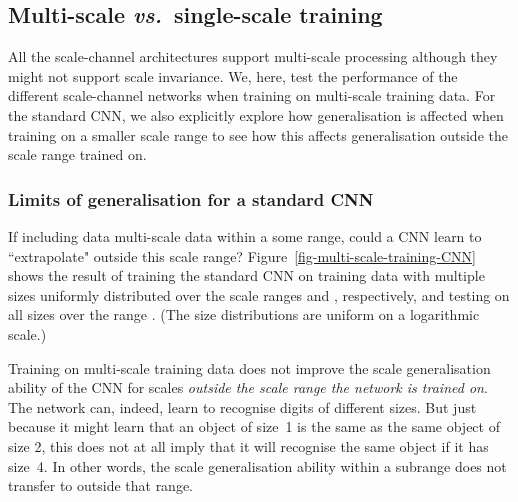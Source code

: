 \documentclass[twocolumn,runningheads]{svjour3}
\begin{document}
\subsection{Multi-scale {\em vs.\/}\ single-scale training}
\label{sec-multi-scale_vs_singlescale}

All the scale-channel architectures support multi-scale processing
although they might not support scale invariance. We, here, test the
performance of the different scale-channel networks when training on
multi-scale training data. For the standard CNN, we also explicitly explore how generalisation is affected when training on a smaller scale range to see how this affects generalisation outside the scale range trained on. 

\subsubsection{Limits of generalisation for a standard CNN}

If including data multi-scale data within a some range, could a CNN learn to ``extrapolate" outside this scale range? Figure~\ref{fig-multi-scale-training-CNN} shows the result of training
the standard CNN on training data with multiple sizes uniformly distributed over the scale ranges  and , respectively, and testing on all sizes
over the range . (The size distributions are uniform on a
logarithmic scale.)

Training on multi-scale training
data does not improve the scale generalisation ability of the CNN for
scales {\em outside the scale range the network is trained on}.
The network can, indeed, learn to recognise digits of different
sizes. But just because it might learn that an object of
size~1 is the same as the same object of size 2, this does
not at all imply that it will recognise the same object if it has
size~4. In other words, the scale generalisation ability within a
subrange does not transfer to outside that range.
\end{document}
